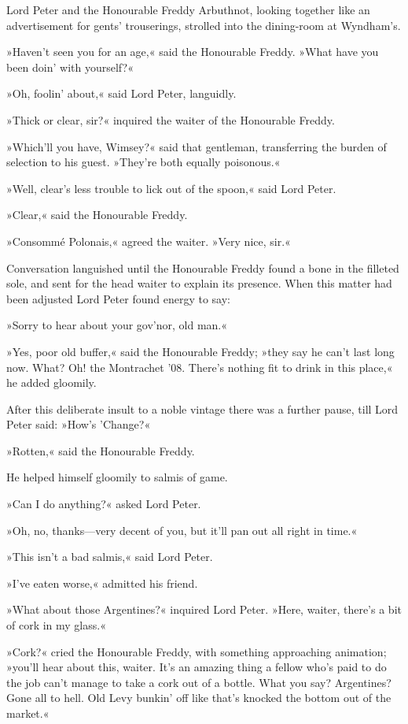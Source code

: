 Lord Peter and the Honourable Freddy Arbuthnot, looking together like an advertisement for gents' trouserings, strolled into the dining-room at Wyndham's.

»Haven't seen you for an age,« said the Honourable Freddy. »What have you been doin' with yourself?«

»Oh, foolin' about,« said Lord Peter, languidly.

»Thick or clear, sir?« inquired the waiter of the Honourable Freddy.

»Which'll you have, Wimsey?« said that gentleman, transferring the burden of selection to his guest. »They're both equally poisonous.«

»Well, clear's less trouble to lick out of the spoon,« said Lord Peter.

»Clear,« said the Honourable Freddy.

»Consommé Polonais,« agreed the waiter. »Very nice, sir.«

Conversation languished until the Honourable Freddy found a bone in the filleted sole, and sent for the head waiter to explain its presence. When this matter had been adjusted Lord Peter found energy to say:

»Sorry to hear about your gov'nor, old man.«

»Yes, poor old buffer,« said the Honourable Freddy; »they say he can't last long now. What? Oh! the Montrachet '08. There's nothing fit to drink in this place,« he added gloomily.

After this deliberate insult to a noble vintage there was a further pause, till Lord Peter said: »How's 'Change?«

»Rotten,« said the Honourable Freddy.

He helped himself gloomily to salmis of game.

»Can I do anything?« asked Lord Peter.

»Oh, no, thanks—very decent of you, but it'll pan out all right in time.«

»This isn't a bad salmis,« said Lord Peter.

»I've eaten worse,« admitted his friend.

»What about those Argentines?« inquired Lord Peter. »Here, waiter, there's a bit of cork in my glass.«

»Cork?« cried the Honourable Freddy, with something approaching animation; »you'll hear about this, waiter. It's an amazing thing a fellow who's paid to do the job can't manage to take a cork out of a bottle. What you say? Argentines? Gone all to hell. Old Levy bunkin' off like that's knocked the bottom out of the market.«

